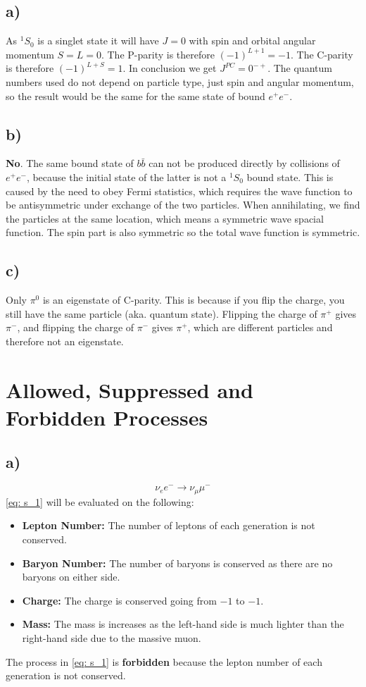 \documentclass{article}
\begin{document}
\subsection*{a)}
As $^{1}S_0$ is a singlet state it will have $J = 0$ with spin and  orbital angular momentum $S = L = 0$. The P-parity is therefore $(-1)^{L + 1} = -1$. The C-parity is therefore $(-1)^{L + S} = 1$. In conclusion we get $J^{PC} = 0^{-+}$. The quantum numbers used do not depend on particle type, just spin and angular momentum, so the result would be the same for the same state of bound $e^{+}e^{-}$.  

\subsection*{b)}
\textbf{No}. The same bound state of $b\bar{b}$ can not be produced directly by collisions of $e^{+}e^{-}$, because the initial state of the latter is not a $^{1}S_0$ bound state. This is caused by the need to obey Fermi statistics, which requires the wave function to be antisymmetric under exchange of the two particles. When annihilating, we find the particles at the same location, which means a symmetric wave spacial function. The spin part is also symmetric so the total wave function is symmetric. 

\subsection*{c)}
Only $π^{0}$ is an eigenstate of C-parity. This is because if you flip the charge, you still have the same particle (aka. quantum state). Flipping the charge of $π^{+}$ gives $π^{-}$, and flipping the charge of $π^{-}$ gives $π^{+}$, which are different particles and therefore not an eigenstate. 


\section{Allowed, Suppressed and Forbidden Processes}
\subsection*{a)}
\begin{equation}\label{eq: s_1}
ν_ee^{-} → ν_{μ}μ^{-}
\end{equation}
\cref{eq: s_1} will be evaluated on the following:
\begin{itemize}
    \item \textbf{Lepton Number:} The number of leptons of each generation is not conserved.  
    \item \textbf{Baryon Number:} The number of baryons is conserved as there are no baryons on either side.
    \item \textbf{Charge:} The charge is conserved going from $-1$ to $-1$. 
    \item \textbf{Mass:} The mass is increases as the left-hand side is much lighter than the right-hand side due to the massive muon. 
\end{itemize}
The process in \cref{eq: s_1} is \textbf{forbidden} because the lepton number of each generation is not conserved. 
\end{document}
